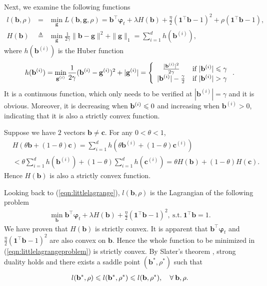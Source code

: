 \documentclass[twoside,11pt]{article}
\begin{document}
Next, we examine the following functions
\begin{eqnarray}
\label{eqn:littlelagrange}
l(\mathbf{b},\rho)&=&\min_{\mathbf{g}}L(\mathbf{b},\mathbf{g},\rho)=\mathbf{b}^\top\bm{\varphi}_t{+}\lambda H(\mathbf{b}){+}\frac{\eta}{2}(\mathbf{1}^\top\mathbf{b}{-}1)^2{+}\rho(\mathbf{1}^\top\mathbf{b}{-}1),\qquad\\
\label{eqn:hubervec}
H(\mathbf{b})&{\triangleq}&\min_{\mathbf{g}}\frac{1}{2\gamma}\|\mathbf{b}{-}\mathbf{g}\|^2{+}\|\mathbf{g}\|_1{=}\sum_{i=1}^{d}h(\mathbf{b}^{(i)}),
\end{eqnarray}
where $h(\mathbf{b}^{(i)})$ is the Huber function \citep{admm}
\begin{align}
\label{eqn:huber}
h(\mathbf{b}^{(i)})=\min_{\mathbf{g}^{(i)}}\frac{1}{2\gamma}(\mathbf{b}^{(i)}-\mathbf{g}^{(i)})^2+|\mathbf{g}^{(i)}|=\left\{ \begin{array}{cl}
\frac{|\mathbf{b}^{(i)}|^2}{2\gamma} & \text{if } |\mathbf{b}^{(i)}|\leqs \gamma\\
|\mathbf{b}^{(i)}|-\frac{\gamma}{2} & \text{if } |\mathbf{b}^{(i)}|> \gamma
\end{array} \right..
\end{align}
It is a continuous function, which only needs to be verified at $|\mathbf{b}^{(i)}|= \gamma$ and it is obvious. Moreover, it is decreasing when $\mathbf{b}^{(i)}\leqslant 0$ and increasing when $\mathbf{b}^{(i)}> 0$, indicating that it is also a strictly convex function.

Suppose we have $2$ vectors $\mathbf{b}\ne \mathbf{c}$. For any $0<\theta<1$,
\begin{align*}
&H(\theta\mathbf{b}+(1-\theta)\mathbf{c})=\sum_{i=1}^{d}h(\theta\mathbf{b}^{(i)}+(1-\theta)\mathbf{c}^{(i)})\\
&{<}\theta\sum_{i=1}^{d} h(\mathbf{b}^{(i)}){+}(1{-}\theta)\sum_{i=1}^{d} h(\mathbf{c}^{(i)})=\theta H(\mathbf{b}){+} (1{-}\theta) H(\mathbf{c}).
\end{align*}
Hence $H(\mathbf{b})$ is also a strictly convex function.

Looking back to (\ref{eqn:littlelagrange}), $l(\mathbf{b},\rho)$ is the Lagrangian of the following problem
\begin{eqnarray}
\label{eqn:littlelagrangeproblem}
\min_{\mathbf{b}}\mathbf{b}^\top\bm{\varphi}_t{+}\lambda H(\mathbf{b}){+}\frac{\eta}{2}(\mathbf{1}^\top\mathbf{b}{-}1)^2,\:\text{s.t.}\: \mathbf{1}^\top\mathbf{b}=1.
\end{eqnarray}
We have proven that $H(\mathbf{b})$ is strictly convex. It is apparent that $\mathbf{b}^\top\bm{\varphi}_t$ and $\frac{\eta}{2}(\mathbf{1}^\top\mathbf{b}{-}1)^2$ are also convex on $\mathbf{b}$. Hence the whole function to be minimized in (\ref{eqn:littlelagrangeproblem}) is strictly convex. By Slater's theorem \citep{CONOPTIM}, strong duality holds and there exists a saddle point $(\mathbf{b}^*,\rho^*)$ such that
\begin{eqnarray}
\label{eqn:saddlepointlittle}
 l(\mathbf{b}^*,\rho)\leqslant  l(\mathbf{b}^*,\rho^*)\leqslant  l(\mathbf{b},\rho^*),\quad \forall \: \mathbf{b},\rho.
\end{eqnarray}
\end{document}
